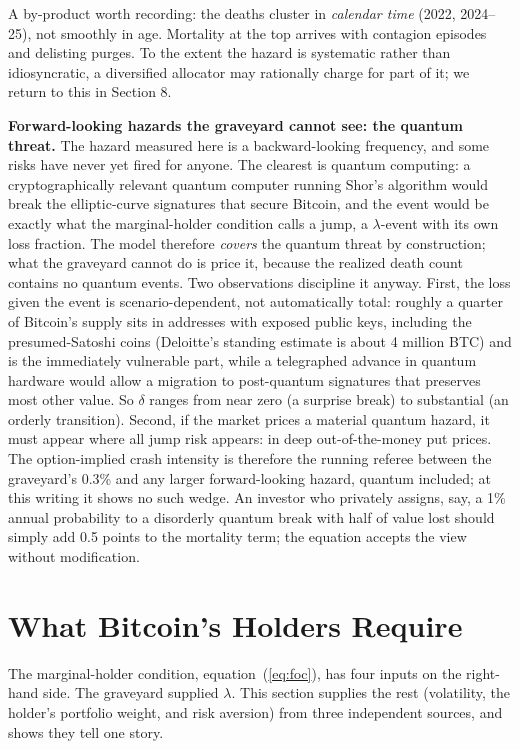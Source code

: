 \documentclass[11pt]{article}
\begin{document}
A by-product worth recording: the deaths cluster in \emph{calendar time} (2022, 2024--25), not smoothly in age. Mortality at the top arrives with contagion episodes and delisting purges. To the extent the hazard is systematic rather than idiosyncratic, a diversified allocator may rationally charge for part of it; we return to this in Section 8.

\textbf{Forward-looking hazards the graveyard cannot see: the quantum threat.} The hazard measured here is a backward-looking frequency, and some risks have never yet fired for anyone. The clearest is quantum computing: a cryptographically relevant quantum computer running Shor's algorithm would break the elliptic-curve signatures that secure Bitcoin, and the event would be exactly what the marginal-holder condition calls a jump, a $\lambda$-event with its own loss fraction. The model therefore \emph{covers} the quantum threat by construction; what the graveyard cannot do is price it, because the realized death count contains no quantum events. Two observations discipline it anyway. First, the loss given the event is scenario-dependent, not automatically total: roughly a quarter of Bitcoin's supply sits in addresses with exposed public keys, including the presumed-Satoshi coins (Deloitte's standing estimate is about 4 million BTC) and is the immediately vulnerable part, while a telegraphed advance in quantum hardware would allow a migration to post-quantum signatures that preserves most other value. So $\delta$ ranges from near zero (a surprise break) to substantial (an orderly transition). Second, if the market prices a material quantum hazard, it must appear where all jump risk appears: in deep out-of-the-money put prices. The option-implied crash intensity is therefore the running referee between the graveyard's 0.3\% and any larger forward-looking hazard, quantum included; at this writing it shows no such wedge. An investor who privately assigns, say, a 1\% annual probability to a disorderly quantum break with half of value lost should simply add 0.5 points to the mortality term; the equation accepts the view without modification.

\section{What Bitcoin's Holders Require}

The marginal-holder condition, equation~(\ref{eq:foc}), has four inputs on the right-hand side. The graveyard supplied $\lambda$. This section supplies the rest (volatility, the holder's portfolio weight, and risk aversion) from three independent sources, and shows they tell one story.
\end{document}
